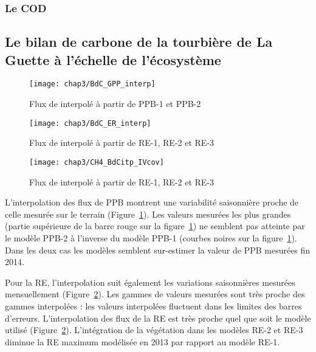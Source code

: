 \subsubsection{Le COD}


\subsection{Le bilan de carbone de la tourbière de La Guette à l'échelle de l'écosystème}


\begin{figure}
\centering
\texttt{[image: chap3/BdC\_GPP\_interp]}
\caption{Flux de \coo interpolé à partir de PPB-1 et PPB-2}
\label{fig:BdC_GPP_interp}
\end{figure}

\begin{figure}
\centering
\texttt{[image: chap3/BdC\_ER\_interp]}
\caption{Flux de \coo interpolé à partir de RE-1, RE-2 et RE-3}
\label{fig:BdC_ER_interp}
\end{figure}

\begin{figure}
\centering
\texttt{[image: chap3/CH4\_BdCitp\_IVcov]}
\caption{Flux de \coo interpolé à partir de RE-1, RE-2 et RE-3}
\label{fig:BdC_CH4_interp}
\end{figure}



L'interpolation des flux de PPB montrent une variabilité saisonnière proche de celle mesurée sur le terrain (Figure~\ref{fig:BdC_GPP_interp}). 
Les valeurs mesurées les plus grandes (partie supérieure de la barre rouge sur la figure~\ref{fig:BdC_GPP_interp}) ne semblent pas atteinte par le modèle PPB-2 à l'inverse du modèle PPB-1 (courbes noires sur la figure~\ref{fig:BdC_GPP_interp}).
Dans les deux cas les modèles semblent sur-estimer la valeur de PPB mesurées fin 2014.

Pour la RE, l'interpolation suit également les variations saisonnières mesurées mensuellement (Figure~\ref{fig:BdC_ER_interp}).
Les gammes de valeurs mesurées sont très proche des gammes interpolées :
les valeurs interpolées fluctuent dans les limites des barres d'erreurs.
L'interpolation des flux de la RE est très proche quel que soit le modèle utilisé (Figure~\ref{fig:BdC_ER_interp}).
L'intégration de la végétation dans les modèles RE-2 et RE-3 diminue la RE maximum modélisée en 2013 par rapport au modèle RE-1.

